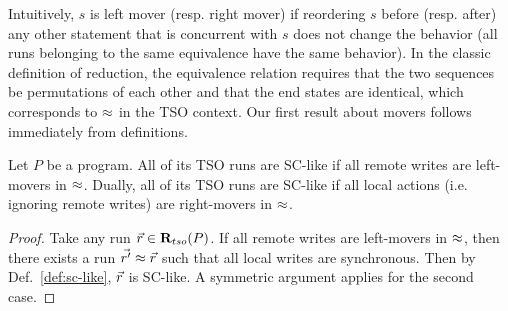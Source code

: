 Intuitively, $s$ is left mover (resp. right mover) if reordering $s$ before (resp. after) any other statement that is concurrent with $s$ does not change the behavior (all runs belonging to the same equivalence have the same behavior).
In the classic definition of reduction, the equivalence relation requires that the two sequences be permutations of each other and that the end states are identical, which corresponds to $\approx$ in the TSO context.
Our first result about movers follows immediately from definitions.
\begin{lemma}
Let $P$ be a program.
All of its TSO runs are SC-like if all remote writes are left-movers in $\approx$.
Dually, all of its TSO runs are SC-like if all local actions (i.e. ignoring remote writes) are right-movers in $\approx$.
\end{lemma}
\begin{proof}
Take any run $\vec{r}\in \mathbf{R}_{tso}(P)$.
If all remote writes are left-movers in $\approx$, then there exists a run $\vec{r'}\approx\vec{r}$ such that all local writes are synchronous. 
Then by Def.~\ref{def:sc-like}, $\vec{r}$ is SC-like.
A symmetric argument applies for the second case.
\end{proof}

